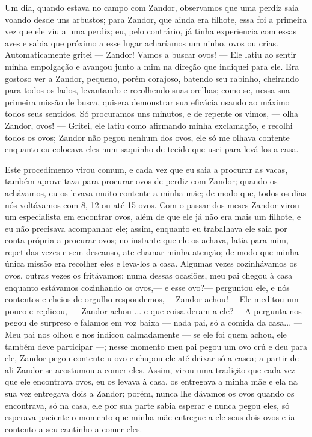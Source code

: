 Um dia, quando estava no campo com Zandor, observamos que uma perdiz saia voando desde uns arbustos; para Zandor, que ainda era filhote, essa foi a primeira vez que ele viu a uma perdiz; eu, pelo contrário, já tinha experiencia com essas aves e sabia que próximo a esse lugar acharíamos um ninho, ovos ou crias. 
Automaticamente gritei --- Zandor! Vamos a buscar ovos! --- Ele latiu ao sentir minha empolgação e avançou junto a mim na direção que indiquei para ele. 
Era gostoso ver a Zandor, pequeno, porém corajoso, batendo seu rabinho, cheirando para todos os lados, levantando e recolhendo suas orelhas; como se, nessa sua primeira missão de busca, quisera demonstrar sua eficácia usando ao máximo todos seus sentidos. 
Só procuramos uns minutos, e de repente os vimos, --- olha Zandor, ovos! --- Gritei, ele latiu como afirmando minha exclamação, e recolhi todos os ovos; Zandor não pegou nenhum dos ovos, ele só me olhava contente enquanto eu colocava eles num saquinho de tecido que usei para levá-los a casa. 

Este procedimento virou comum, e cada vez que eu saia a procurar as vacas, também aproveitava para procurar ovos de perdiz com Zandor; quando os achávamos, eu os levava muito contente a minha mãe; de modo que, todos os dias nós voltávamos com 8, 12 ou até 15 ovos. 
Com o passar dos meses Zandor virou um especialista em encontrar ovos, além de que ele já não era mais um filhote, e eu não precisava acompanhar ele; assim, enquanto eu trabalhava ele saia por conta própria a procurar ovos; no instante que ele os achava, latia para mim, repetidas vezes e sem descanso, ate chamar minha atenção; de modo que minha única missão era recolher eles e leva-los a casa.
Algumas vezes cozinhávamos os ovos, outras vezes os fritávamos; numa dessas ocasiões, meu pai chegou à casa enquanto estávamos cozinhando os ovos,--- e esse ovo?--- perguntou ele, e nós contentos e cheios de orgulho respondemos,--- Zandor achou!---
Ele meditou um pouco e replicou, --- Zandor achou ... e que coisa deram a ele?--- A pergunta nos pegou de surpreso e falamos em voz baixa --- nada pai, só a comida da casa... --- Meu pai nos olhou e nos indicou calmadamente --- se ele foi quem achou, ele também deve participar ---; 
nesse momento meu pai pegou um ovo crú e deu para ele, Zandor pegou contente u ovo e chupou ele até deixar só a casca; a partir de ali Zandor se acostumou a comer eles. Assim, virou uma tradição que cada vez que ele encontrava ovos, eu os levava à casa, os entregava a minha mãe e ela na sua vez entregava dois a Zandor; porém, nunca lhe dávamos os ovos quando os encontrava, só na casa, ele por sua parte sabia esperar e nunca pegou eles, só esperava paciente o momento que minha mãe entregue a ele seus dois ovos e ia contento a seu cantinho a comer eles.


